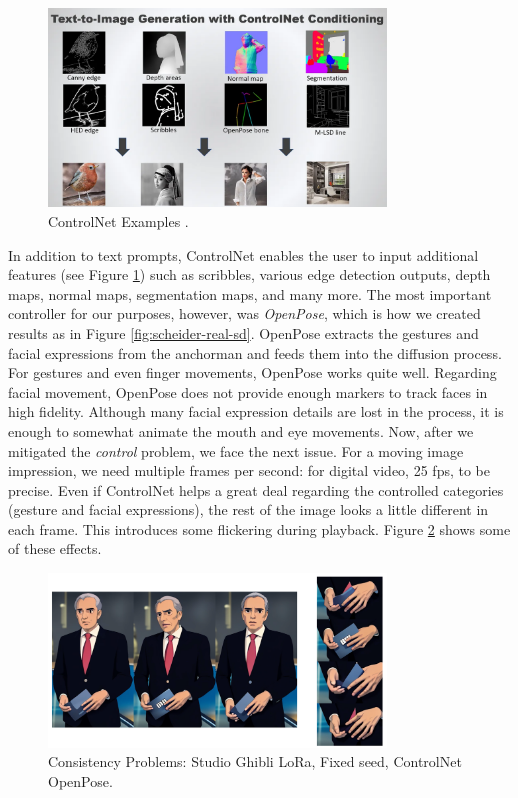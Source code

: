 \documentclass[
  a4paper,  %
  twoside,  %
  bibliography=totoc,
  headsepline,
  cleardoublepage=empty,
  parskip=half,
  draft=false
]{scrbook}
\begin{document}
\begin{figure}[h]
  \centering
  \includegraphics[width=0.8\textwidth]{./graphics/diffusion/ControlNet.png}
  \caption{ControlNet Examples \cite{foongIntroductionControlNetStable2023}.}
  \label{fig:ControlNet}
\end{figure}

In addition to text prompts, ControlNet enables the user to input additional features (see Figure \ref{fig:ControlNet}) such as scribbles, various edge detection outputs, depth maps, normal maps, segmentation maps, and many more. The most important controller for our purposes, however, was \textit{OpenPose}, which is how we created results as in Figure \ref{fig:scheider-real-sd}. OpenPose extracts the gestures and facial expressions from the anchorman and feeds them into the diffusion process. For gestures and even finger movements, OpenPose works quite well. Regarding facial movement, OpenPose does not provide enough markers to track faces in high fidelity. Although many facial expression details are lost in the process, it is enough to somewhat animate the mouth and eye movements.
Now, after we mitigated the \textit{control} problem, we face the next issue. For a moving image impression, we need multiple frames per second: for digital video, 25 \gls{fps}, to be precise. Even if ControlNet helps a great deal regarding the controlled categories (gesture and facial expressions), the rest of the image looks a little different in each frame. This introduces some flickering during playback. Figure \ref{fig:controlnet-issues} shows some of these effects.

\begin{figure}[h]
  \centering
  \includegraphics[width=0.8\textwidth]{./graphics/diffusion/ControlNet-issues.png}
  \caption{Consistency Problems: Studio Ghibli LoRa, Fixed seed, ControlNet OpenPose.}
  \label{fig:controlnet-issues}
\end{figure}
\end{document}
